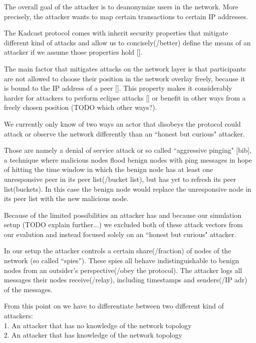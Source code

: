 The overall goal of the attacker is to deanonymize users in the network.
More precisely, the attacker wants to map certain transactions to certain IP addresses.

The Kadcast protocol comes with inherit security properties that mitigate different kind of attacks
and allow us to concisely(/better) define the means of an attacker if we assume those properties hold [].

The main factor that mitigates attacks on the network layer is that participants are
not allowed to choose their position in the network overlay freely, because it is bound to the IP address of a peer [].
This property makes it considerably harder for attackers to perform eclipse attacks [] or benefit in other ways from
a freely chosen position (TODO which other ways?).

We currently only know of two ways an actor that disobeys the protocol could attack or observe the network differently than
an ``honest but curious" attacker.

Those are namely a denial of service attack or so called ``aggressive pinging" [bib], a technique where malicious nodes flood
benign nodes with ping messages in hope of hitting the time window in which the benign node has at least one unresponsive
peer in its peer list(/bucket list), but has yet to refresh its peer list(buckets). In this case
the benign node would replace the unresponsive node in its peer list with the new malicious node.

Because of the limited possibilities an attacker has and because our simulation setup (TODO explain further...)
we excluded both of these attack vectors from our evalution and instead focused solely on an ``honest but curious" attacker.

In our setup the attacker controls a certain share(/fraction) of nodes of the network (so called ``spies'').
These spies all behave indistinguishable to benign nodes from an outsider's perspective(/obey the protocol).
The attacker logs all messages their nodes receive(/relay), including timestamps and senders(/IP adr) of the messages.

From this point on we have to differentiate between two different kind of attackers: \\
1. An attacker that has no knowledge of the network topology \\
2. An attacker that has knowledge of the network topology

